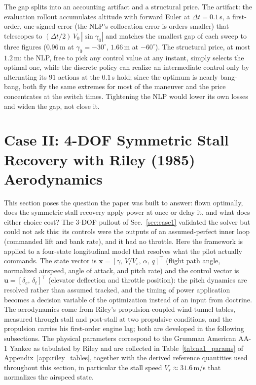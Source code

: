 \documentclass[journal ]{new-aiaa}
\begin{document}


The gap splits into an accounting artifact and a structural price.
The artifact: the evaluation rollout accumulates altitude with
forward Euler at $\Delta t = 0.1$\,s, a first-order, one-signed
error (the NLP's collocation error is orders smaller) that
telescopes to $(\Delta t/2)\, V_0\, |\sin\gamma_0|$
and matches the smallest gap of each sweep to three figures
($0.96$\,m at $\gamma_0 = -30^\circ$, $1.66$\,m at $-60^\circ$). The
structural price, at most $1.2$\,m: the NLP, free to pick any
control value at any instant, simply selects the optimal one, while
the discrete policy can realize an intermediate control only by
alternating its $91$ actions at the $0.1$\,s hold; since the optimum
is nearly bang-bang, both fly the same extremes for most of the
maneuver and the price concentrates at the switch times.
Tightening the NLP would lower its own losses and widen the gap, not
close it.

\section{Case II: 4-DOF Symmetric Stall Recovery with Riley (1985) Aerodynamics}

This section poses the question the paper was built to answer: flown
optimally, does the symmetric stall recovery apply power at once or
delay it, and what does either choice cost? The 3-DOF pullout of
Sec.~\ref{sec:case1} validated the solver but could not ask this:
its controls were the outputs of an assumed-perfect inner loop
(commanded lift and bank rate), and it had no throttle. Here the
framework is applied to a four-state longitudinal model that
resolves what the pilot actually commands. The state vector is
$\mathbf{x} = [\gamma,\, V/V_s,\, \alpha,\, q]^\top$
(flight path angle, normalized airspeed, angle of attack, and pitch
rate) and the control vector is
$\mathbf{u} = [\delta_e,\, \delta_t]^\top$
(elevator deflection and throttle position): the pitch dynamics are
resolved rather than assumed tracked, and the timing of power
application becomes a decision variable of the optimization instead
of an input from doctrine. The aerodynamics come from Riley's
propulsion-coupled wind-tunnel tables, measured through stall and
post-stall at two propulsive conditions, and the propulsion carries
his first-order engine lag; both are developed in the following
subsections. The physical parameters
correspond to the Grumman American AA-1 Yankee as tabulated by Riley
\cite{Riley1985} and are collected in Table~\ref{tab:aa1_params} of
Appendix~\ref{app:riley_tables}, together with the derived reference
quantities used throughout this section, in particular the stall
speed $V_s \approx 31.6$\,m/s that normalizes the airspeed state.
\end{document}
